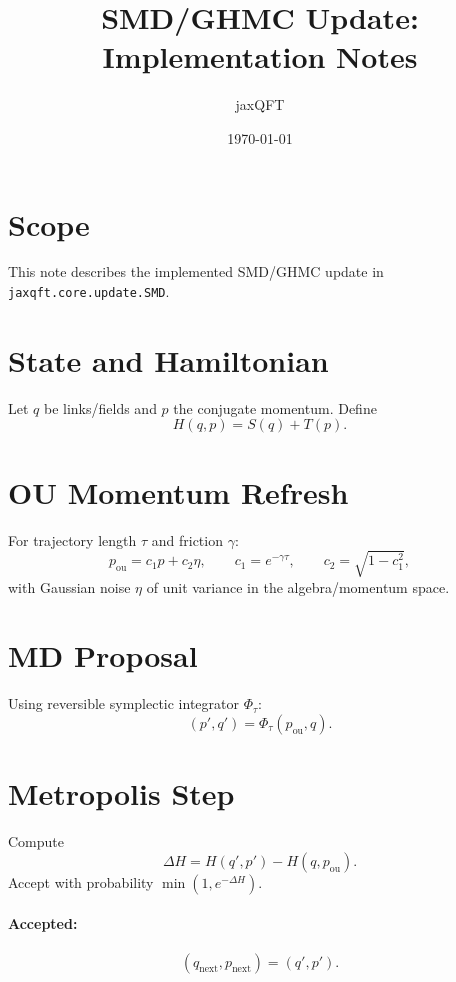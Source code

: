 \documentclass[11pt]{article}
\title{SMD/GHMC Update: Implementation Notes}
\author{jaxQFT}
\date{\today}
\begin{document}
\maketitle

\section{Scope}
This note describes the implemented SMD/GHMC update in
\texttt{jaxqft.core.update.SMD}.

\section{State and Hamiltonian}
Let $q$ be links/fields and $p$ the conjugate momentum. Define
\begin{equation}
H(q,p) = S(q) + T(p).
\end{equation}

\section{OU Momentum Refresh}
For trajectory length $\tau$ and friction $\gamma$:
\begin{equation}
p_{\mathrm{ou}} = c_1 p + c_2 \eta,
\qquad c_1 = e^{-\gamma\tau},
\qquad c_2 = \sqrt{1-c_1^2},
\end{equation}
with Gaussian noise $\eta$ of unit variance in the algebra/momentum space.

\section{MD Proposal}
Using reversible symplectic integrator $\Phi_\tau$:
\begin{equation}
(p', q') = \Phi_\tau(p_{\mathrm{ou}}, q).
\end{equation}

\section{Metropolis Step}
Compute
\begin{equation}
\Delta H = H(q',p') - H(q,p_{\mathrm{ou}}).
\end{equation}
Accept with probability $\min(1,e^{-\Delta H})$.

\paragraph{Accepted:}
\begin{equation}
(q_{\mathrm{next}}, p_{\mathrm{next}}) = (q', p').
\end{equation}
\end{document}
